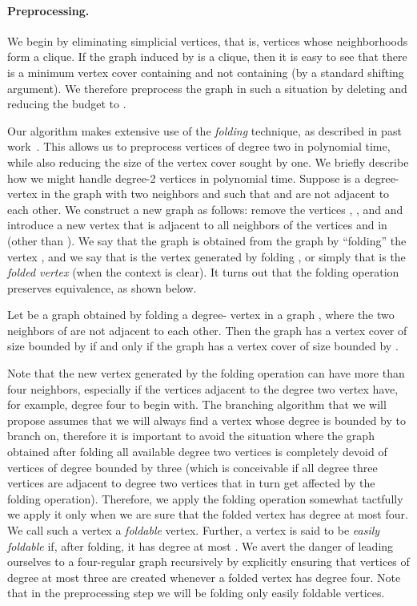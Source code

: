 \documentclass[svgnames]{llncs}
\begin{document}
\paragraph{Preprocessing.} 

We begin by eliminating simplicial vertices, that is, vertices whose neighborhoods form a clique. If the graph induced by  is a clique, then it is easy to see that there is a minimum vertex cover containing  and not containing  (by a standard shifting argument). We therefore preprocess the graph in such a situation by deleting  and reducing the budget to . 




Our algorithm makes extensive use of the \emph{folding} technique, as described in past work~\cite{CKJ99,CKX06}. This allows us to preprocess vertices of degree two in polynomial time, while also reducing the size of the vertex cover sought by one. We briefly describe how we might handle degree-2 vertices in polynomial time.
Suppose  is a degree- vertex in the graph  with two neighbors  and  such that  and  are not adjacent to each other. We construct a new graph  as follows: 
remove the vertices , , and  and introduce a new 
vertex  that is adjacent to all neighbors of the vertices  and  in  (other than ). We say that the graph  is obtained from the graph  by ``folding'' the vertex , and we say 
that  is the vertex generated by folding , or simply that  is the \emph{folded vertex} (when the context is clear). It turns out that the folding operation preserves equivalence, as shown below. 

\begin{proposition}\cite[Lemma 2.3]{CKJ99}
Let  be a graph obtained by folding a degree- vertex  in a graph , where the two neighbors of  are not adjacent to each other. Then the graph  has a vertex cover of size bounded by  if and only if the graph  has a vertex cover of size bounded by .
\end{proposition}

Note that the new vertex generated by the folding operation can have more than four neighbors, especially if the vertices adjacent to 
the degree two vertex have, for example, degree four to begin with. The branching algorithm that we will propose assumes that we will always find a 
vertex whose degree is bounded by  to branch on, therefore it is important to avoid the situation where the graph obtained after folding all available degree two vertices is completely devoid of vertices of degree bounded by three 
(which is conceivable if all degree three vertices are adjacent to degree two vertices that in turn get affected by the folding operation). 
Therefore, we apply the folding operation somewhat tactfully we apply it only when we are sure that the folded vertex has degree at most four. We call such a vertex a \emph{foldable} vertex.
Further, a vertex is said to be \emph{easily foldable} if, after folding, it has degree at most .
We avert the danger of leading ourselves to a four-regular graph recursively by explicitly ensuring that vertices of degree at most three are created whenever a folded vertex has degree four.
Note that in the preprocessing step we will be folding only easily foldable vertices.
\end{document}
